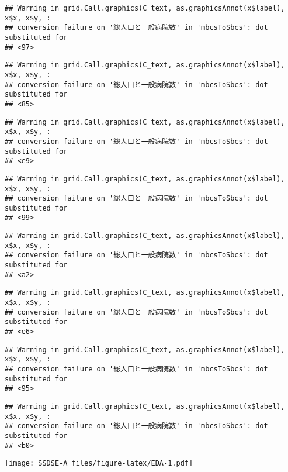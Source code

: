 \documentclass[
]{article}
\begin{document}
\begin{verbatim}
## Warning in grid.Call.graphics(C_text, as.graphicsAnnot(x$label), x$x, x$y, :
## conversion failure on '総人口と一般病院数' in 'mbcsToSbcs': dot substituted for
## <97>
\end{verbatim}

\begin{verbatim}
## Warning in grid.Call.graphics(C_text, as.graphicsAnnot(x$label), x$x, x$y, :
## conversion failure on '総人口と一般病院数' in 'mbcsToSbcs': dot substituted for
## <85>
\end{verbatim}

\begin{verbatim}
## Warning in grid.Call.graphics(C_text, as.graphicsAnnot(x$label), x$x, x$y, :
## conversion failure on '総人口と一般病院数' in 'mbcsToSbcs': dot substituted for
## <e9>
\end{verbatim}

\begin{verbatim}
## Warning in grid.Call.graphics(C_text, as.graphicsAnnot(x$label), x$x, x$y, :
## conversion failure on '総人口と一般病院数' in 'mbcsToSbcs': dot substituted for
## <99>
\end{verbatim}

\begin{verbatim}
## Warning in grid.Call.graphics(C_text, as.graphicsAnnot(x$label), x$x, x$y, :
## conversion failure on '総人口と一般病院数' in 'mbcsToSbcs': dot substituted for
## <a2>
\end{verbatim}

\begin{verbatim}
## Warning in grid.Call.graphics(C_text, as.graphicsAnnot(x$label), x$x, x$y, :
## conversion failure on '総人口と一般病院数' in 'mbcsToSbcs': dot substituted for
## <e6>
\end{verbatim}

\begin{verbatim}
## Warning in grid.Call.graphics(C_text, as.graphicsAnnot(x$label), x$x, x$y, :
## conversion failure on '総人口と一般病院数' in 'mbcsToSbcs': dot substituted for
## <95>
\end{verbatim}

\begin{verbatim}
## Warning in grid.Call.graphics(C_text, as.graphicsAnnot(x$label), x$x, x$y, :
## conversion failure on '総人口と一般病院数' in 'mbcsToSbcs': dot substituted for
## <b0>
\end{verbatim}

\texttt{[image: SSDSE-A\_files/figure-latex/EDA-1.pdf]}
\end{document}
